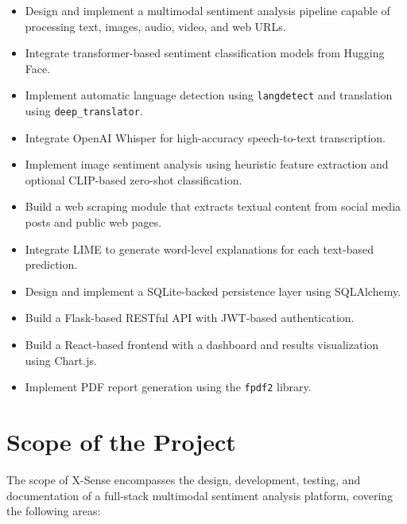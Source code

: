 \documentclass[12pt, a4paper]{report}
\begin{document}
\begin{itemize}[noitemsep, leftmargin=1.5em]
    \item Design and implement a multimodal sentiment analysis pipeline capable of processing text, images, audio, video, and web URLs.
    \item Integrate transformer-based sentiment classification models from Hugging Face.
    \item Implement automatic language detection using \texttt{langdetect} and translation using \texttt{deep\_translator}.
    \item Integrate OpenAI Whisper for high-accuracy speech-to-text transcription.
    \item Implement image sentiment analysis using heuristic feature extraction and optional CLIP-based zero-shot classification.
    \item Build a web scraping module that extracts textual content from social media posts and public web pages.
    \item Integrate LIME to generate word-level explanations for each text-based prediction.
    \item Design and implement a SQLite-backed persistence layer using SQLAlchemy.
    \item Build a Flask-based RESTful API with JWT-based authentication.
    \item Build a React-based frontend with a dashboard and results visualization using Chart.js.
    \item Implement PDF report generation using the \texttt{fpdf2} library.
\end{itemize}

\section{Scope of the Project}

The scope of X-Sense encompasses the design, development, testing, and documentation of a full-stack multimodal sentiment analysis platform, covering the following areas:
\end{document}
